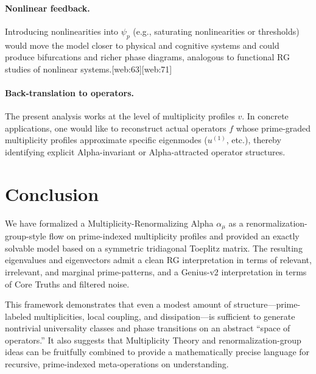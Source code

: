 \documentclass[11pt]{article}
\begin{document}
\paragraph{Nonlinear feedback.}
Introducing nonlinearities into $\psi_p$ (e.g., saturating nonlinearities or thresholds) would move the model closer to physical and cognitive systems and could produce bifurcations and richer phase diagrams, analogous to functional RG studies of nonlinear systems.[web:63][web:71]

\paragraph{Back-translation to operators.}
The present analysis works at the level of multiplicity profiles $v$.
In concrete applications, one would like to reconstruct actual operators $f$ whose prime-graded multiplicity profiles approximate specific eigenmodes ($u^{(1)}$, etc.), thereby identifying explicit Alpha-invariant or Alpha-attracted operator structures.

\section{Conclusion}

We have formalized a Multiplicity-Renormalizing Alpha $\alpha_\mu$ as a renormalization-group-style flow on prime-indexed multiplicity profiles and provided an exactly solvable model based on a symmetric tridiagonal Toeplitz matrix.
The resulting eigenvalues and eigenvectors admit a clean RG interpretation in terms of relevant, irrelevant, and marginal prime-patterns, and a Genius-v2 interpretation in terms of Core Truths and filtered noise.

This framework demonstrates that even a modest amount of structure---prime-labeled multiplicities, local coupling, and dissipation---is sufficient to generate nontrivial universality classes and phase transitions on an abstract ``space of operators.''
It also suggests that Multiplicity Theory and renormalization-group ideas can be fruitfully combined to provide a mathematically precise language for recursive, prime-indexed meta-operations on understanding.
\end{document}
